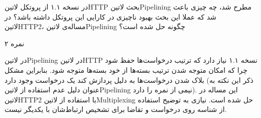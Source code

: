 
در نسخه ۱.۱ از پروتکل ‌لاتین{HTTP} بحث ‌لاتین{Pipelining} مطرح شد، چه چیزی باعث شد که عملا این بحث بهبود ناچیزی در کارایی این پروتکل داشته باشد؟
در ‌لاتین{HTTP2}، مساله‌ی ‌لاتین{Pipelining} چگونه حل شده است؟

۲ نمره

\begin{پاسخ}

در ‌لاتین{Pipelining} در ‌لاتین{HTTP} نسخه ۱.۱ نیاز دارد که ترتیب درخواست‌ها حفظ شود
چرا که امکان متوجه شدن ترتیب بسته‌ها از خود بسته‌ها متوجه شود.
بنابراین مشکل بلاک شدن درخواست‌ها به دلیل پردازش کند یک درخواست
وجود دارد (ذکر این نکته به عنوان دلیل عدم استفاده از ‌لاتین{Pipelining} نیمی از نمره را دارد). این مساله در ‌لاتین{HTTP2} با استفاده از ‌لاتین{Multiplexing} حل شده است.
نیازی به توضیح استفاده از شناسه روی درخواست و تقاضا برای تشخیص ارتباط‌شان با یکدیگر نیست.

\end{پاسخ}
